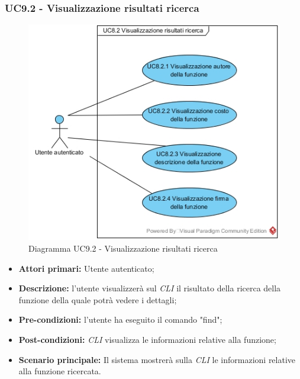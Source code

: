 \subsubsection{UC9.2 - Visualizzazione risultati ricerca}
\begin{figure}[h]
	\centering
	\includegraphics[width=0.7\linewidth]{res/img/UC8.2.jpg}
	\caption{Diagramma UC9.2 - Visualizzazione risultati ricerca}
\end{figure}
\begin{itemize}
	\item \textbf{Attori primari:} Utente autenticato;
	\item \textbf{Descrizione:} l'utente visualizzerà sul \textit{CLI\glo} il risultato della ricerca della funzione della quale potrà vedere i dettagli;
	\item \textbf{Pre-condizioni:} l'utente ha eseguito il comando "find";
	\item \textbf{Post-condizioni:} \textit{CLI\glo} visualizza le informazioni relative alla funzione;
	\item \textbf{Scenario principale:} Il sistema mostrerà sulla \textit{CLI\glo} le informazioni relative alla funzione ricercata.
\end{itemize}
